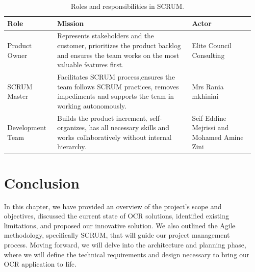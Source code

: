 \begin{table}[!htpb]
    \caption{Roles and responsibilities in SCRUM.}
    \centering
    \begin{tabular}{|p{3cm}|p{6cm}|p{3cm}|}
        \hline
        \textbf{Role} &\textbf{ Mission} & \textbf{Actor} \\ \hline
        Product Owner & Represents stakeholders and the customer, prioritizes the product backlog and ensures the team works on the most valuable features first. & Elite Council Consulting \\ \hline
        SCRUM Master & Facilitates SCRUM process,ensures the team follows SCRUM practices, removes impediments and supports the team in working autonomously. & Mrs Rania mkhinini \\ \hline
        Development Team &  Builds the product increment, self-organizes, has all necessary skills  and works collaboratively without internal hierarchy. & Seif Eddine Mejrissi and Mohamed Amine Zini \\ \hline
    \end{tabular}
    
    \label{tab:team_roles}
\end{table}



\section{Conclusion }

In this chapter, we have provided an overview of the project's scope and objectives, discussed the current state of OCR solutions, identified existing limitations, and proposed our innovative solution. We also outlined the Agile methodology, specifically SCRUM, that will guide our project management process. Moving forward, we will delve into the architecture and planning phase, where we will define the technical requirements and design necessary to bring our OCR application to life.